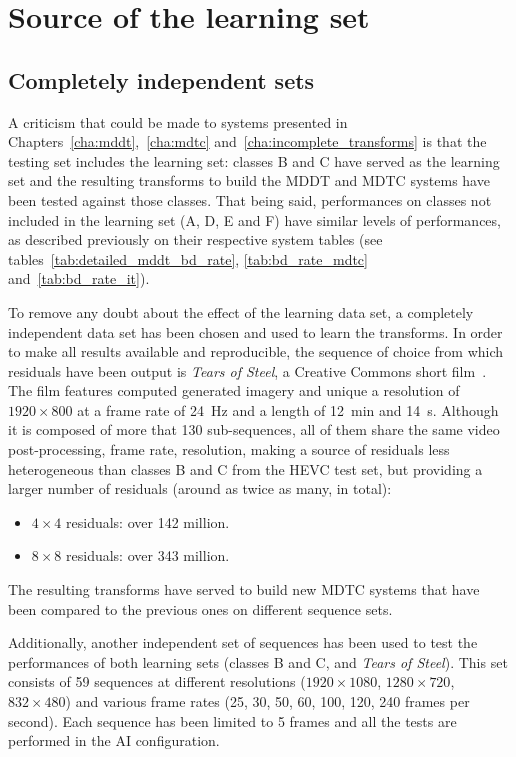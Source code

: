 \documentclass[11pt,a4paper,openright,twoside]{book}
\numberwithin{equation}{section} %
\numberwithin{figure}{section} %
\numberwithin{table}{section} %
\begin{document}
\section{Source of the learning set}
\label{sec:rw_source_of_the_learning_set}

\subsection{Completely independent sets}
\label{sub:rw_completely_independent_sets}

A criticism that could be made to systems presented in
Chapters~\ref{cha:mddt},~\ref{cha:mdtc} and~\ref{cha:incomplete_transforms} is
that the testing set includes the learning set:
classes B and C have served as the learning set and the resulting transforms
to build the \ac{MDDT} and \ac{MDTC} systems have been tested against those
classes.
That being said, performances on classes not included in the learning set (A,
D, E and F) have similar levels of performances, as described previously on
their respective system tables (see tables~\ref{tab:detailed_mddt_bd_rate},
\ref{tab:bd_rate_mdtc} and~\ref{tab:bd_rate_it}).

To remove any doubt about the effect of the learning data set, a completely
independent data set has been chosen and used to learn the transforms.
In order to make all results available and reproducible, the sequence of
choice from which residuals have been output is \emph{Tears of Steel}, a
Creative Commons short film~\cite{blender-tearsofsteel}.
The film features computed generated imagery and unique a resolution of
$1920\times800$ at a frame rate of \SI{24}{\hertz} and a length of
\SI{12}{\minute} and \SI{14}{\second}.
Although it is composed of more that 130 sub-sequences, all of them share the
same video post-processing, frame rate, resolution, making a source of
residuals less heterogeneous than classes B and C from the \ac{HEVC} test set,
but providing a larger number of residuals (around as twice as many, in
total):
\begin{itemize}
	\item $4\times4$ residuals: over 142 million.
	\item $8\times8$ residuals: over 343 million.
\end{itemize}

The resulting transforms have served to build new \ac{MDTC} systems that have
been compared to the previous ones on different sequence sets.

Additionally, another independent set of sequences has been used to test the
performances of both learning sets (classes B and C, and \emph{Tears of
Steel}).
This set consists of 59 sequences at different resolutions ($1920\times1080$,
$1280\times720$, $832\times480$) and various frame rates (25, 30, 50, 60, 100,
120, 240 frames per second).
Each sequence has been limited to 5 frames and all the tests are performed
in the \ac{AI} configuration.
\end{document}
